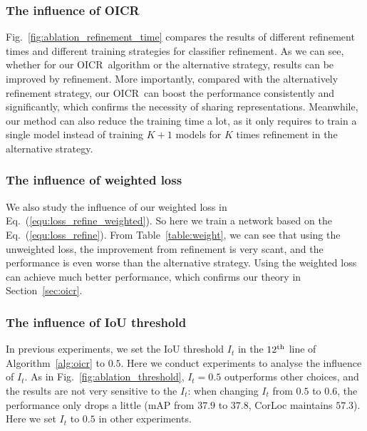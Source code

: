 \documentclass[10pt,twocolumn,letterpaper]{article}
\def\methodname{OICR}
\begin{document}
\subsubsection{The influence of OICR}
\label{sec:influence_oil}

Fig.~\ref{fig:ablation_refinement_time} compares the results of different refinement times and different training strategies for classifier refinement.
As we can see, whether for our \methodname\ algorithm or the alternative strategy, results can be improved by refinement.
More importantly, compared with the alternatively refinement strategy, our \methodname\ can boost the performance consistently and significantly, which confirms the necessity of sharing representations.
Meanwhile, our method can also reduce the training time a lot, as it only requires to train a single model instead of training $K+1$ models for $K$ times refinement in the alternative strategy.


\subsubsection{The influence of weighted loss}
\label{sec:influence_wl}

We also study the influence of our weighted loss in Eq.~(\ref{equ:loss_refine_weighted}).
So here we train a network based on the Eq.~(\ref{equ:loss_refine}).
From Table~\ref{table:weight}, we can see that using the unweighted loss, the improvement from refinement is very scant, and the performance is even worse than the alternative strategy.
Using the weighted loss can achieve much better performance, which confirms our theory in Section~\ref{sec:oicr}.


\subsubsection{The influence of IoU threshold}
\label{sec:influence_it}

In previous experiments, we set the IoU threshold $I_{t}$ in the $12^{\textup{th}}$ line of Algorithm~\ref{alg:oicr} to $0.5$.
Here we conduct experiments to analyse the influence of $I_{t}$.
As in Fig.~\ref{fig:ablation_threshold}, $I_{t}=0.5$ outperforms other choices, and the results are not very sensitive to the $I_{t}$: when changing $I_{t}$ from $0.5$ to $0.6$, the performance only drops a little (mAP from $37.9$ to $37.8$, CorLoc maintains $57.3$).
Here we set $I_{t}$ to $0.5$ in other experiments.
\end{document}
